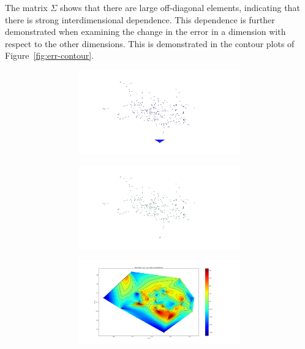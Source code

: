 The matrix $\Sigma$ shows that there are large off-diagonal elements, indicating that there is strong interdimensional dependence. This dependence is further demonstrated when examining the change in the error in a dimension with respect to the other dimensions. This is demonstrated in the contour plots of Figure~\ref{fig:err-contour}. 

\begin{figure}
  \centering
  \begin{subfigure}{0.48\textwidth}
    \begin{subfigure}{\textwidth}
      \includegraphics[clip, trim = 120 0 120 0, width=\textwidth]{figures/chapter3/contour_x}
    \end{subfigure}
    \begin{subfigure}{\textwidth}
      \includegraphics[clip, trim = 120 0 120 0, width=\textwidth]{figures/chapter3/contour_y}
    \end{subfigure}
    \begin{subfigure}{\textwidth}
      \includegraphics[clip, trim = 120 0 120 0, width=\textwidth]{figures/chapter3/contour_z}

\end{subfigure}
\end{subfigure}
\end{figure}
